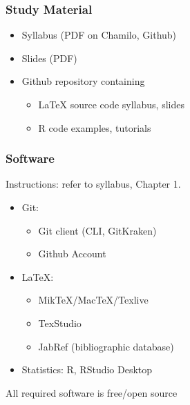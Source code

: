 \documentclass[aspectratio=169]{beamer}
\begin{document}
\begin{frame}
  \frametitle{Study Material}

  \begin{itemize}
    \item Syllabus (PDF on Chamilo, Github)
    \item Slides (PDF)
    \item Github repository containing
    \begin{itemize}
      \item \LaTeX{} source code syllabus, slides
      \item R code examples, tutorials
    \end{itemize}
  \end{itemize}    

\end{frame}

\begin{frame}
  \frametitle{Software}
  
  Instructions: refer to syllabus, Chapter 1.
  
  \begin{itemize}
    \item Git:
    \begin{itemize}
      \item Git client (CLI, GitKraken)
      \item Github Account 
    \end{itemize}
    \item {\LaTeX}:
    \begin{itemize}
      \item MikTeX/MacTeX/Texlive
      \item TexStudio
      \item JabRef (bibliographic database)
    \end{itemize}
    \item Statistics: R, RStudio Desktop
  \end{itemize}
  
  \centering
  All required software is free/open source
\end{frame}
\end{document}
